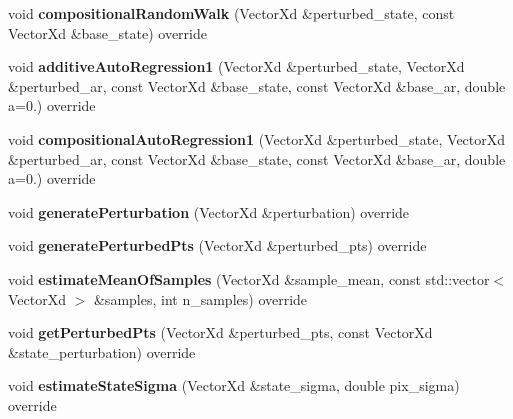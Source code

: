 \begin{DoxyCompactItemize}
\item 
\hypertarget{classProjectiveBase_adc3b9b1e1b4f31089aba0bd3af3de109}{void {\bfseries compositional\-Random\-Walk} (Vector\-Xd \&perturbed\-\_\-state, const Vector\-Xd \&base\-\_\-state) override}\label{classProjectiveBase_adc3b9b1e1b4f31089aba0bd3af3de109}

\item 
\hypertarget{classProjectiveBase_a15b7b0d6e1226102a2646e516622226d}{void {\bfseries additive\-Auto\-Regression1} (Vector\-Xd \&perturbed\-\_\-state, Vector\-Xd \&perturbed\-\_\-ar, const Vector\-Xd \&base\-\_\-state, const Vector\-Xd \&base\-\_\-ar, double a=0.) override}\label{classProjectiveBase_a15b7b0d6e1226102a2646e516622226d}

\item 
\hypertarget{classProjectiveBase_a3871a29f648507d82b7daca67c68262e}{void {\bfseries compositional\-Auto\-Regression1} (Vector\-Xd \&perturbed\-\_\-state, Vector\-Xd \&perturbed\-\_\-ar, const Vector\-Xd \&base\-\_\-state, const Vector\-Xd \&base\-\_\-ar, double a=0.) override}\label{classProjectiveBase_a3871a29f648507d82b7daca67c68262e}

\item 
\hypertarget{classProjectiveBase_aa3097d82ece74efc783cdd4ff4c112b9}{void {\bfseries generate\-Perturbation} (Vector\-Xd \&perturbation) override}\label{classProjectiveBase_aa3097d82ece74efc783cdd4ff4c112b9}

\item 
\hypertarget{classProjectiveBase_ae749bc545a75f091903323ba92d51eb3}{void {\bfseries generate\-Perturbed\-Pts} (Vector\-Xd \&perturbed\-\_\-pts) override}\label{classProjectiveBase_ae749bc545a75f091903323ba92d51eb3}

\item 
\hypertarget{classProjectiveBase_a6e8c888f186c2688d3903e3aa631e6ac}{void {\bfseries estimate\-Mean\-Of\-Samples} (Vector\-Xd \&sample\-\_\-mean, const std\-::vector$<$ Vector\-Xd $>$ \&samples, int n\-\_\-samples) override}\label{classProjectiveBase_a6e8c888f186c2688d3903e3aa631e6ac}

\item 
\hypertarget{classProjectiveBase_a559a95f25203bbd9990a128adb6e9135}{void {\bfseries get\-Perturbed\-Pts} (Vector\-Xd \&perturbed\-\_\-pts, const Vector\-Xd \&state\-\_\-perturbation) override}\label{classProjectiveBase_a559a95f25203bbd9990a128adb6e9135}

\item 
\hypertarget{classProjectiveBase_a7a245b6be4704da571c3f78501e8cd32}{void {\bfseries estimate\-State\-Sigma} (Vector\-Xd \&state\-\_\-sigma, double pix\-\_\-sigma) override}\label{classProjectiveBase_a7a245b6be4704da571c3f78501e8cd32}


\end{DoxyCompactItemize}
